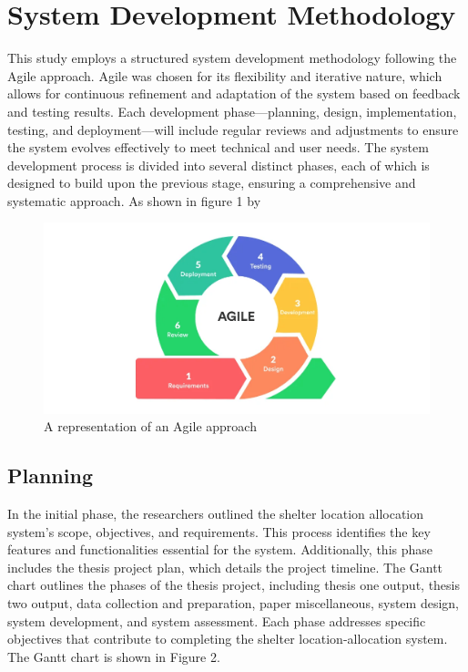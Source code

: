 \section{System Development Methodology}

This study employs a structured system development methodology following the Agile approach. Agile was chosen for its flexibility and iterative nature, which allows for continuous refinement and adaptation of the system based on feedback and testing results. Each development phase—planning, design, implementation, testing, and deployment—will include regular reviews and adjustments to ensure the system evolves effectively to meet technical and user needs.
The system development process is divided into several distinct phases, each of which is designed to build upon the previous stage, ensuring a comprehensive and systematic approach. As shown in figure 1 by 

\begin{figure}[h!]
	\caption{A representation of an Agile approach}
	\centering
	\includegraphics[width=\textwidth]{AGILE}
\end{figure}

\subsection{Planning}

In the initial phase, the researchers outlined the shelter location allocation system's scope, objectives, and requirements. This process identifies the key features and functionalities essential for the system. Additionally, this phase includes the thesis project plan, which details the project timeline.
The Gantt chart outlines the phases of the thesis project, including thesis one output, thesis two output, data collection and preparation, paper miscellaneous, system design, system development, and system assessment. Each phase addresses specific objectives that contribute to completing the shelter location-allocation system. The Gantt chart is shown in Figure 2.

